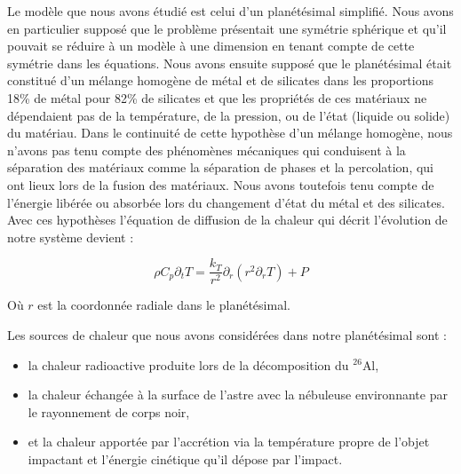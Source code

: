 \documentclass[10pt,a4paper]{article}
\numberwithin{equation}{section}
\begin{document}
Le modèle que nous avons étudié est celui d'un planétésimal simplifié. Nous avons en particulier supposé que le problème présentait une symétrie sphérique et qu'il pouvait se réduire à un modèle à une dimension en tenant compte de cette symétrie dans les équations. Nous avons ensuite supposé que le planétésimal était constitué d'un mélange homogène de métal et de silicates dans les proportions 18\% de métal pour 82\% de silicates et que les propriétés de ces matériaux ne dépendaient pas de la température, de la pression, ou de l'état (liquide ou solide) du matériau. Dans le continuité de cette hypothèse d'un mélange homogène, nous n'avons pas tenu compte des phénomènes mécaniques qui conduisent à la séparation des matériaux comme la séparation de phases et la percolation, qui ont lieux lors de la fusion des matériaux. Nous avons toutefois tenu compte de l’énergie libérée ou absorbée lors du changement d'état du métal et des silicates.
Avec ces hypothèses l'équation de diffusion de la chaleur qui décrit l'évolution de notre système devient :

\begin{equation}
\rho C_p \partial_{t} T = \frac{k_{T}}{r^2} \partial_{r} (  {r}^2 \partial_{r} T)  + P
\end{equation}

Où $r$ est la coordonnée radiale dans le planétésimal.

Les sources de chaleur que nous avons considérées dans notre planétésimal sont :
\begin{itemize}
\item la chaleur radioactive produite lors de la décomposition du $^{26}$Al,
\item la chaleur échangée à la surface de l'astre avec la nébuleuse environnante par le rayonnement de corps noir, 
\item et la chaleur apportée par l’accrétion via la température propre de l'objet impactant et l'énergie cinétique qu'il dépose par l'impact.
\end{itemize}
\end{document}
